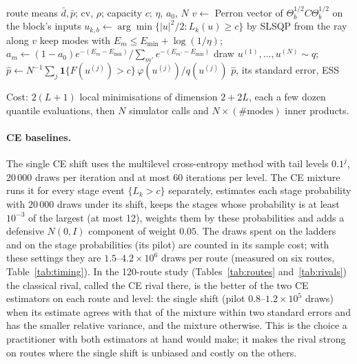 \documentclass[11pt]{article}
\theoremstyle{definition}
\theoremstyle{remark}
\begin{document}
\begin{algorithm}[t]
\caption{SMIS for one route}\label{alg:smis}
\begin{algorithmic}[1]
\Require route means $\bar d,\bar p$; cv, $\rho$; capacity $c$; $\eta$, $a_0$, $N$
  \State $v\gets$ Perron vector of $\Theta_b^{1/2}C\Theta_b^{1/2}$ on the block's inputs
  \State $u_{k,b}\gets\arg\min\{|u|^2/2 : L_k(u)\ge c\}$ by SLSQP from the ray along $v$
\EndFor
\State keep modes with $E_m\le E_{\min}+\log(1/\eta)$; $a_m\gets(1-a_0)e^{-(E_m-E_{\min})}/\sum_{m'}e^{-(E_{m'}-E_{\min})}$
\State draw $u^{(1)},\dots,u^{(N)}\sim q$; $\hat p\gets N^{-1}\sum_j \mathbf 1\{F(u^{(j)})>c\}\,\varphi(u^{(j)})/q(u^{(j)})$
\State \Return $\hat p$, its standard error, ESS
\end{algorithmic}
\end{algorithm}

Cost: $2(L+1)$ local minimisations of dimension $2+2L$, each a few dozen
quantile evaluations, then $N$ simulator calls and $N\times(\#\text{modes})$
inner products.

\paragraph{CE baselines.} The single CE shift uses the multilevel
cross-entropy method with tail levels $0.1^j$, $20\,000$ draws per iteration
and at most $60$ iterations per level. The CE mixture runs it for every stage
event $\{L_k>c\}$ separately, estimates each stage probability with
$20\,000$ draws under its shift, keeps the stages whose probability is at least
$10^{-3}$ of the largest (at most 12), weights them by these probabilities and
adds a defensive $N(0,I)$ component of weight $0.05$. The draws spent on the
ladders and on the stage probabilities (its pilot) are counted in its sample
cost; with these settings they are $1.5$--$4.2\times10^6$ draws per route
(measured on six routes, Table~\ref{tab:timing}). In the 120-route study
(Tables~\ref{tab:routes} and~\ref{tab:rivals}) the classical rival, called the
CE rival there, is the better of the two CE estimators on each route and level:
the single shift (pilot $0.8$--$1.2\times10^5$ draws) when its estimate agrees
with that of the mixture within two standard errors and has the smaller relative
variance, and the mixture otherwise. This is the choice a practitioner with
both estimators at hand would make; it makes the rival strong on routes where
the single shift is unbiased and costly on the others.
\end{document}
